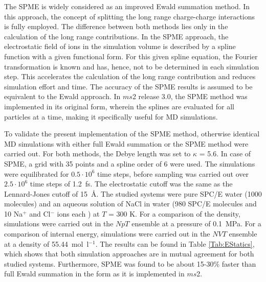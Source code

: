 \documentclass[preprint,12pt]{elsarticle}
\begin{document}
The SPME is widely considered as an improved Ewald summation method. In this approach, the concept of splitting the long range charge-charge interactions is fully employed. The difference between both methods lies only in the calculation of the long range contributions. In the SPME approach, the electrostatic field of ions in the simulation volume is described by a spline function with a given functional form. For this given spline equation, the Fourier transformation is known and has, hence, not to be determined in each simulation step. This accelerates the calculation of the long range contribution and reduces simulation effort and time. The accuracy of the SPME results is assumed to be equivalent to the Ewald approach. In $ms$2 release 3.0, the SPME method was implemented in its original form, wherein the splines are evaluated for all particles at a time, making it specifically useful for MD simulations. 

\textcolor[rgb]{0,0.58,0}{To validate the present implementation of the SPME method, otherwise identical MD simulations with either full Ewald summation or the SPME method were carried out. For both methods, the Debye length was set to $\kappa$ = 5.6. In case of SPME, a grid with 35 points and a spline order of 6 were used. The simulations were equilibrated for $0.5 \cdot 10^6$ time steps, before sampling was carried out over $2.5 \cdot 10^6$ time steps of 1.2~fs. The electrostatic cutoff was the same as the Lennard-Jones cutoff of 15~\AA.  The studied systems were pure SPC/E water \cite{berendsen1987} (1000 molecules) and an aqueous solution of NaCl in water (980 SPC/E molecules and 10 Na$^+$ and Cl$^-$ ions each \cite{reiser2014}) at $T$ = 300 K. For a comparison of the density, simulations were carried out in the $NpT$ ensemble at a pressure of 0.1~MPa. For a comparison of internal energy, simulations were carried out in the $NVT$ ensemble at a density of 55.44~mol~l$^{-1}$. The results can be found in Table \ref{Tab:EStatics}, which shows that both simulation approaches are in mutual agreement for both studied systems. Furthermore, SPME was found to be about 15-30\% faster than full Ewald summation in the form as it is implemented in $ms$2.}
\end{document}
